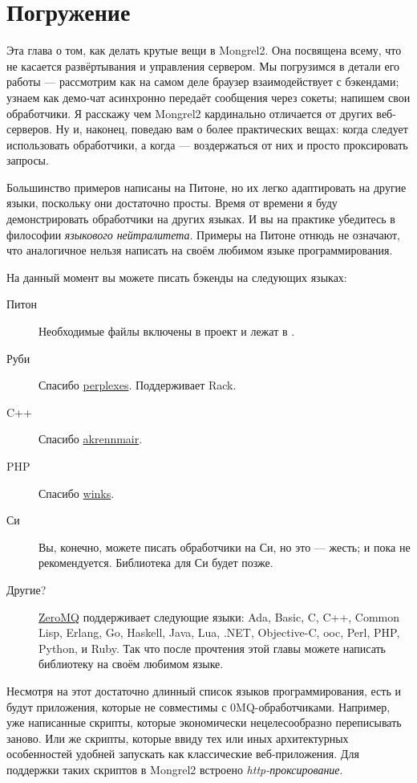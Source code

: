 \chapter{Погружение}

Эта глава о том, как делать крутые вещи в Mongrel2. Она посвящена всему, что не
касается развёртывания и управления сервером. Мы погрузимся в детали его работы
--- рассмотрим как на самом деле браузер взаимодействует с бэкендами; узнаем как
демо-чат асинхронно передаёт сообщения через сокеты; напишем свои обработчики. Я
расскажу чем Mongrel2 кардинально отличается от других веб-серверов.  Ну и,
наконец, поведаю вам о более практических вещах: когда следует использовать
обработчики, а когда --- воздержаться от них и просто проксировать запросы.

Большинство примеров написаны на Питоне, но их легко адаптировать на другие
языки, поскольку они достаточно просты. Время от времени я буду демонстрировать
обработчики на других языках. И вы на практике убедитесь в философии
\emph{языкового нейтралитета}. Примеры на Питоне отнюдь не означают, что
аналогичное нельзя написать на своём любимом языке программирования.

На данный момент вы можете писать бэкенды на следующих языках:

\begin{description}
\item [Питон] Необходимые файлы включены в проект и лежат в .
\item [Руби] Спасибо \href{http://github.com/perplexes/m2r}{perplexes}. Поддерживает Rack.
\item [C++] Спасибо \href{http://github.com/akrennmair/mongrel2-cpp}{akrennmair}.
\item [PHP] Спасибо \href{http://github.com/winks/m2php}{winks}.
\item[Си] Вы, конечно, можете писать обработчики на Си, но это --- жесть; и
пока не рекомендуется. Библиотека для Си будет позже.
\item[Другие?] \href{http://zeromq.org}{ZeroMQ} поддерживает следующие языки:
Ada, Basic, C, C++, Common Lisp, Erlang, Go, Haskell, Java, Lua, .NET,
Objective-C, ooc, Perl, PHP, Python, и Ruby. Так что после прочтения этой главы
можете написать библиотеку на своём любимом языке.
\end{description}

Несмотря на этот достаточно длинный список языков программирования, есть и будут
приложения, которые не совместимы с 0MQ-обработчиками. Например, уже написанные
скрипты, которые экономически нецелесообразно переписывать заново. Или же
скрипты, которые ввиду тех или иных архитектурных особенностей удобней запускать
как классические веб-приложения. Для поддержки таких скриптов в Mongrel2
встроено \emph{http-проксирование}. 

